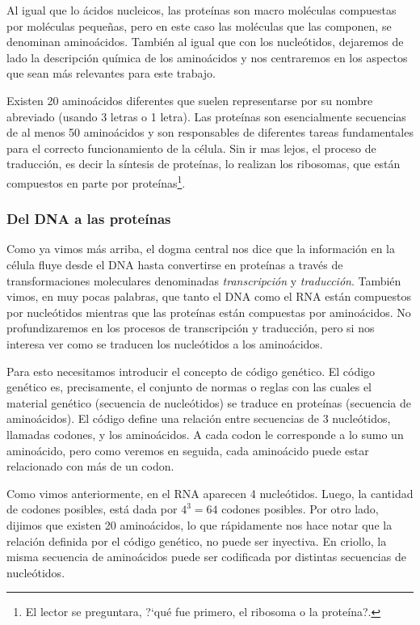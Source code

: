 Al igual que lo \'acidos nucleicos, las prote\'inas son macro mol\'eculas
compuestas por mol\'eculas peque\~nas, pero en este caso las mol\'eculas que
las componen, se denominan amino\'acidos. Tambi\'en al igual que con los
nucle\'otidos, dejaremos de lado la descripci\'on qu\'imica de los
amino\'acidos y nos centraremos en los aspectos que sean m\'as relevantes para
este trabajo.

Existen 20 amino\'acidos diferentes que suelen representarse por su nombre
abreviado (usando 3 letras o 1 letra). Las prote\'inas son esencialmente
secuencias de al menos 50 amino\'acidos y son responsables de diferentes tareas
fundamentales para el correcto funcionamiento de la c\'elula. Sin ir mas lejos,
el proceso de traducci\'on, es decir la s\'intesis de prote\'inas, lo realizan
los ribosomas, que est\'an compuestos en parte por prote\'inas\footnote{El
lector se preguntara, ?`qu\'e fue primero, el ribosoma o la prote\'ina?.}.

\subsubsection{Del \ac{DNA} a las prote\'inas}

Como ya vimos m\'as arriba, el dogma central nos dice que la informaci\'on en la
c\'elula fluye desde el \ac{DNA} hasta convertirse en prote\'inas a trav\'es de
transformaciones moleculares denominadas \textit{transcripci\'on} y
\textit{traducci\'on}. Tambi\'en vimos, en muy pocas palabras, que tanto el
\ac{DNA} como el \ac{RNA} est\'an compuestos por nucle\'otidos mientras que las
prote\'inas est\'an compuestas por amino\'acidos. No profundizaremos en los
procesos de transcripci\'on y traducci\'on, pero si nos interesa ver como se
traducen los nucle\'otidos a los amino\'acidos.

Para esto necesitamos introducir el concepto de c\'odigo gen\'etico. El
c\'odigo gen\'etico es, precisamente, el conjunto de normas o reglas con las
cuales el material gen\'etico (secuencia de nucle\'otidos) se traduce en
prote\'inas (secuencia de amino\'acidos). El c\'odigo define una relaci\'on
entre secuencias de 3 nucle\'otidos, llamadas codones, y los amino\'acidos. A
cada codon le corresponde a lo sumo un amino\'acido, pero como veremos en
seguida, cada amino\'acido puede estar relacionado con m\'as de un codon.

Como vimos anteriormente, en el \ac{RNA} aparecen 4 nucle\'otidos. Luego,
la cantidad de codones posibles, est\'a dada por $4^{3} = 64$ codones
posibles. Por otro lado, dijimos que existen 20 amino\'acidos, lo que
r\'apidamente nos hace notar que la relaci\'on definida por el c\'odigo
gen\'etico, no puede ser inyectiva. En criollo, la misma secuencia de
amino\'acidos puede ser codificada por distintas secuencias de
nucle\'otidos.


